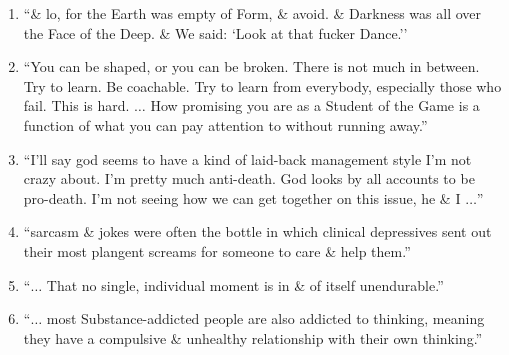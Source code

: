 \documentclass{article}
\numberwithin{equation}{section}
\begin{document}
\begin{enumerate}
	\item ``\& lo, for the Earth was empty of Form, \& avoid. \& Darkness was all over the Face of the Deep. \& We said: `Look at that fucker Dance.''
	\item ``You can be shaped, or you can be broken. There is not much in between. Try to learn. Be coachable. Try to learn from everybody, especially those who fail. This is hard. $\ldots$ How promising you are as a Student of the Game is a function of what you can pay attention to without running away.''
	\item ``I'll say god seems to have a kind of laid-back management style I'm not crazy about. I'm pretty much anti-death. God looks by all accounts to be pro-death. I'm not seeing how we can get together on this issue, he \& I $\ldots$''
	\item ``sarcasm \& jokes were often the bottle in which clinical depressives sent out their most plangent screams for someone to care \& help them.''
	\item ``$\ldots$ That no single, individual moment is in \& of itself unendurable.''
	\item ``$\ldots$ most Substance-addicted people are also addicted to thinking, meaning they have a compulsive \& unhealthy relationship with their own thinking.''
\end{enumerate}


\printbibliography[heading=bibintoc]
	
\end{document}
